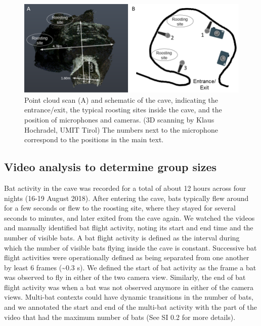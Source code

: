 \documentclass[
]{book}
\begin{document}
\begin{figure}
\includegraphics[width=1\linewidth]{original_papers/hbc-paper/figures/pointcloud_and_topview} \caption{\label{cavesetupschematic}Point cloud scan (A) and schematic of the cave, indicating the entrance/exit, the typical roosting sites inside the cave, and the position of microphones and cameras.   (3D scanning by Klaus Hochradel, UMIT Tirol) The numbers next to the microphone correspond to the positions in the main text.}\label{fig:cavesetupschematic}
\end{figure}

\hypertarget{video-analysis-to-determine-group-sizes}{%
\subsection{Video analysis to determine group sizes}\label{video-analysis-to-determine-group-sizes}}

Bat activity in the cave was recorded for a total of about 12 hours across four nights (16-19 August 2018). After entering the cave, bats typically flew around for a few seconds or flew to the roosting site, where they stayed for several seconds to minutes, and later exited from the cave again. We watched the videos and manually identified bat flight activity, noting its start and end time and the number of visible bats. A bat flight activity is defined as the interval during which the number of visible bats flying inside the cave is constant.
Successive bat flight activities were operationally defined as being separated from one another by least 6 frames (\textasciitilde0.3 s). We defined the start of bat activity as the frame a bat was observed to fly in either of the two camera view. Similarly, the end of bat flight activity was when a bat was not observed anymore in either of the camera views. Multi-bat contexts could have dynamic transitions in the number of bats, and we annotated the start
and end of the multi-bat activity with the part of the video that had the maximum number of bats (See SI 0.2 for more details).
\end{document}
